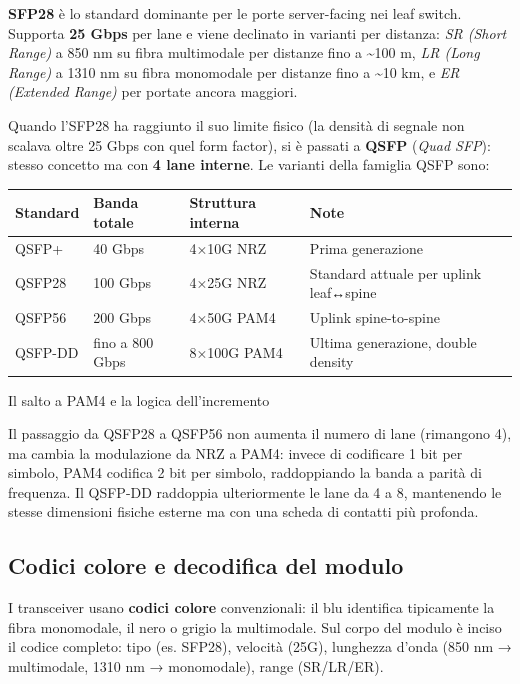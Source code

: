 \documentclass[
  italian,
  openany]{book}
\newcounter{none} %
\begin{document}
\textbf{SFP28} è lo standard dominante per le porte server-facing nei
leaf switch. Supporta \textbf{25 Gbps} per lane e viene declinato in
varianti per distanza: \emph{SR (Short Range)} a 850 nm su fibra
multimodale per distanze fino a \textasciitilde100 m, \emph{LR (Long
Range)} a 1310 nm su fibra monomodale per distanze fino a
\textasciitilde10 km, e \emph{ER (Extended Range)} per portate ancora
maggiori.

Quando l'SFP28 ha raggiunto il suo limite fisico (la densità di segnale
non scalava oltre 25 Gbps con quel form factor), si è passati a
\textbf{QSFP} (\emph{Quad SFP}): stesso concetto ma con \textbf{4 lane
interne}. Le varianti della famiglia QSFP sono:

{\def\LTcaptype{none} %
\begin{longtable}[]{@{}llll@{}}
\toprule\noalign{}
Standard & Banda totale & Struttura interna & Note \\
\midrule\noalign{}
\endhead
\bottomrule\noalign{}
\endlastfoot
QSFP+ & 40 Gbps & 4×10G NRZ & Prima generazione \\
QSFP28 & 100 Gbps & 4×25G NRZ & Standard attuale per uplink
leaf↔spine \\
QSFP56 & 200 Gbps & 4×50G PAM4 & Uplink spine-to-spine \\
QSFP-DD & fino a 800 Gbps & 8×100G PAM4 & Ultima generazione, double
density \\
\end{longtable}
}

\begin{calloutnote}{Il salto a PAM4 e la logica dell’incremento}

Il passaggio da QSFP28 a QSFP56 non aumenta il numero di lane (rimangono
4), ma cambia la modulazione da NRZ a PAM4: invece di codificare 1 bit
per simbolo, PAM4 codifica 2 bit per simbolo, raddoppiando la banda a
parità di frequenza. Il QSFP-DD raddoppia ulteriormente le lane da 4 a
8, mantenendo le stesse dimensioni fisiche esterne ma con una scheda di
contatti più profonda.

\end{calloutnote}

\subsection{Codici colore e decodifica del
modulo}\label{codici-colore-e-decodifica-del-modulo}

I transceiver usano \textbf{codici colore} convenzionali: il blu
identifica tipicamente la fibra monomodale, il nero o grigio la
multimodale. Sul corpo del modulo è inciso il codice completo: tipo (es.
SFP28), velocità (25G), lunghezza d'onda (850 nm → multimodale, 1310 nm
→ monomodale), range (SR/LR/ER).
\end{document}
